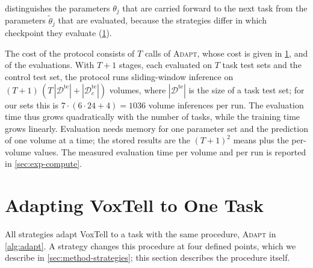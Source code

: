  distinguishes the parameters $\theta_j$ that are carried forward to the next task from the parameters $\tilde{\theta}_j$ that are evaluated, because the strategies differ in which checkpoint they evaluate (\cref{sec:method-adaptation}).

The cost of the protocol consists of $T$ calls of \textsc{Adapt}, whose cost is given in \cref{sec:method-adaptation}, and of the evaluations.
With $T+1$ stages, each evaluated on $T$ task test sets and the control test set, the protocol runs sliding-window inference on $(T+1)\,(T\,|\mathcal{D}^{\mathrm{te}}| + |\mathcal{D}_c^{\mathrm{te}}|)$ volumes, where $|\mathcal{D}^{\mathrm{te}}|$ is the size of a task test set; for our sets this is $7 \cdot (6 \cdot 24 + 4) = 1036$ volume inferences per run.
The evaluation time thus grows quadratically with the number of tasks, while the training time grows linearly.
Evaluation needs memory for one parameter set and the prediction of one volume at a time; the stored results are the $(T+1)^2$ means plus the per-volume values.
The measured evaluation time per volume and per run is reported in \cref{sec:exp-compute}.

\section{Adapting VoxTell to One Task}
\label{sec:method-adaptation}

All strategies adapt VoxTell to a task with the same procedure, \textsc{Adapt} in \cref{alg:adapt}.
A strategy changes this procedure at four defined points, which we describe in \cref{sec:method-strategies}; this section describes the procedure itself.

